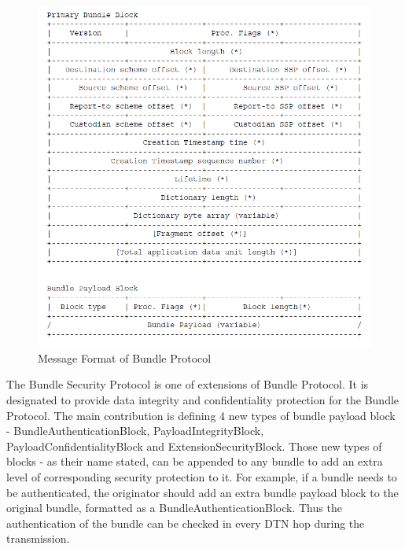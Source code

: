 \begin{figure}[h!]
\centering
\includegraphics[width=\textwidth,natwidth=829,natheight=847]{figures/bundleblockformat.png}
\caption{Message Format of Bundle Protocol \cite{RFC5050}}
\label{fig:bundleblockformat}
\end{figure}

The Bundle Security Protocol is one of extensions of Bundle Protocol. It is designated to provide data integrity and confidentiality protection for the Bundle Protocol. The main contribution is defining 4 new types of bundle payload block - BundleAuthenticationBlock, PayloadIntegrityBlock, PayloadConfidentialityBlock and ExtensionSecurityBlock. Those new types of blocks - as their name stated, can be appended to any bundle to add an extra level of corresponding security protection to it. For example, if a bundle needs to be authenticated, the originator should add an extra bundle payload block to the original bundle, formatted as a BundleAuthenticationBlock. Thus the authentication of the bundle can be checked in every DTN hop during the transmission.

